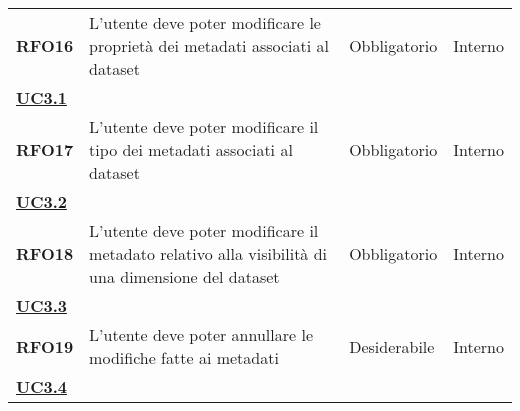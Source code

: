 \begin{longtable}[H]{>{\centering\bfseries}m{2cm} >{\centering}m{9cm} >{\centering}m{2.5cm} >{\centering\arraybackslash}m{2.5cm}}
    RFO16
    & L'utente deve poter modificare le proprietà dei metadati associati al dataset
    & Obbligatorio
    & Interno \\ \hyperref[ssub:uc3.1]{UC3.1} \\

    RFO17
    & L'utente deve poter modificare il tipo dei metadati associati al dataset
    & Obbligatorio
    & Interno \\ \hyperref[sub:uc3.2]{UC3.2} \\

    RFO18
    & L'utente deve poter modificare il metadato relativo alla visibilità di una dimensione del dataset
    & Obbligatorio
    & Interno \\ \hyperref[sub:uc3.3]{UC3.3} \\

    RFO19
    & L'utente deve poter annullare le modifiche fatte ai metadati
    & Desiderabile
    & Interno \\ \hyperref[ssub:uc3.4]{UC3.4} \\

\end{longtable}